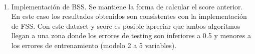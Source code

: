 \documentclass[11pt]{article}
\begin{document}
    \begin{center}
    \end{center}
    { \hspace*{\fill} \\}
    
    \begin{enumerate}
\def\labelenumi{(\alph{enumi})}
\setcounter{enumi}{1}
\itemsep1pt\parskip0pt
\item
  Implementación de BSS. Se mantiene la forma de calcular el score
  anterior. En este caso los resultados obtenidos son consistentes con
  la implementación de FSS. Con este dataset y score es posible apreciar
  que ambos algoritmos llegan a una zona donde los errores de testing
  son inferiores a 0.5 y menores a los errores de entrenamiento (modelo
  2 a 5 variables).
\end{enumerate}
\end{document}
